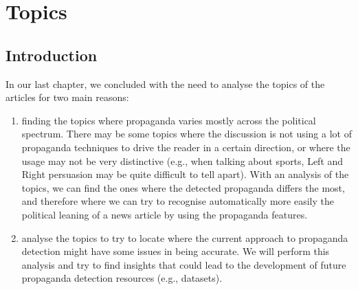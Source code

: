 \chapter{\statusorange Topics}
\label{chap:topics}

\section{\statusgreen Introduction}






In our last chapter, we concluded with the need to analyse the topics of the articles for two main reasons:

\begin{enumerate}
    \item finding the topics where propaganda varies mostly across the political spectrum. There may be some topics where the discussion is not using a lot of propaganda techniques to drive the reader in a certain direction, or where the usage may not be very distinctive (e.g., when talking about sports, Left and Right persuasion may be quite difficult to tell apart). With an analysis of the topics, we can find the ones where the detected propaganda differs the most, and therefore where we can try to recognise automatically more easily the political leaning of a news article by using the propaganda features.
    \item analyse the topics to try to locate where the current approach to propaganda detection might have some issues in being accurate. We will perform this analysis and try to find insights that could lead to the development of future propaganda detection resources (e.g., datasets).
\end{enumerate}

